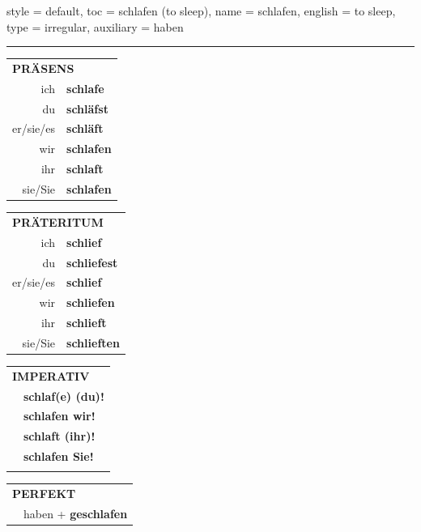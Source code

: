 \begin{verbentry}{
  style = {default},
  toc = {schlafen (to sleep)},
  name = {schlafen},
  english = {to sleep},
  type = {irregular},
  auxiliary = {haben}
}
 
    
     \vspace{5pt}

    \hrule
    
    \vspace{5pt}

  \begin{tabular}{rl}
     \multicolumn{2}{l}{\textbf{PRÄSENS} }\\
    ich & \textbf{schlafe}\\
    du & \textbf{schläfst}\\
    er/sie/es & \textbf{schläft}\\
    wir & \textbf{schlafen}\\
    ihr & \textbf{schlaft}\\
    sie/Sie & \textbf{schlafen}\\
  \end{tabular}
  \hfill
     \begin{tabular}{rl}
    \multicolumn{2}{l}{\textbf{PRÄTERITUM} }\\
    ich & \textbf{schlief}\\
    du & \textbf{schliefest}\\
    er/sie/es & \textbf{schlief}\\
    wir & \textbf{schliefen}\\
    ihr & \textbf{schlieft}\\
    sie/Sie & \textbf{schlieften}\\
  \end{tabular}
  \hfill
  \begin{tabular}{rl}
     \multicolumn{2}{l}{\textbf{IMPERATIV} }\\
   & \textbf{schlaf(e) (du)!}\\
   & \textbf{schlafen wir!}\\
   & \textbf{schlaft (ihr)!}\\
   & \textbf{schlafen Sie!}\\
   & \vspace{10pt}
  \end{tabular}

    \vspace{10pt}

 \begin{tabular}{rl}
     \multicolumn{2}{l}{\textbf{PERFEKT}}\\
  &  haben + \textbf{geschlafen}\\
  \end{tabular}
\hfill
   \begin{tabular}{rl}
   

\end{tabular}
\end{verbentry}
